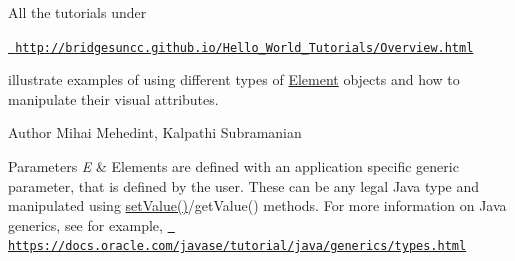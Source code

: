 All the tutorials under

\href{http://bridgesuncc.github.io/Hello_World_Tutorials/Overview.html}{\texttt{ http\+://bridgesuncc.\+github.\+io/\+Hello\+\_\+\+World\+\_\+\+Tutorials/\+Overview.\+html}}

illustrate examples of using different types of \mbox{\hyperlink{classbridges_1_1base_1_1_element}{Element}} objects and how to manipulate their visual attributes.

\begin{DoxyAuthor}{Author}
Mihai Mehedint, Kalpathi Subramanian
\end{DoxyAuthor}

\begin{DoxyParams}{Parameters}
{\em E} & Elements are defined with an application specific generic parameter, that is defined by the user. These can be any legal Java type and manipulated using \mbox{\hyperlink{classbridges_1_1base_1_1_element_ab3cf1241da0bc4c59cea9d6f0fd7aaf4}{set\+Value()}}/get\+Value() methods. For more information on Java generics, see for example, \href{https://docs.oracle.com/javase/tutorial/java/generics/types.html}{\texttt{ https\+://docs.\+oracle.\+com/javase/tutorial/java/generics/types.\+html}} \\
\hline
\end{DoxyParams}
